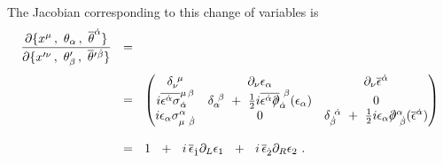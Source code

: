 \documentclass[12pt]{article}
\newcommand{\p}{\partial}
\newcommand{\ov}{\overline}
\def\slashed#1{\setbox0=\hbox{$#1$}             %
   \dimen0=\wd0                                 %
   \setbox1=\hbox{/} \dimen1=\wd1               %
   \ifdim\dimen0>\dimen1                        %
      \rlap{\hbox to \dimen0{\hfil/\hfil}}      %
      #1                                        %
   \else                                        %
      \rlap{\hbox to \dimen1{\hfil$#1$\hfil}}   %
      /                                         %
   \fi}                                        %
\begin{document}
The Jacobian corresponding to this change of variables is
\begin{align*}
	\frac{\p \{ x^\mu\,,~ \theta_\alpha\,,~\ov{\theta}^{\dot{\alpha}} \} }
		{\p \{ x'^\nu \,,~ \theta_\beta'\,,~ \ov{\theta}{}'{}^{\dot{\beta}} \} }  & ~~=~~
\\[1.0mm]
	& ~~=~~
\begin{pmatrix}
	\delta_\nu^{\ \mu}   &   \p_\nu \epsilon_\alpha  &     \p_\nu \ov{\epsilon}^{\dot{\alpha}}  \\
	i \ov{\epsilon^{\dot{\alpha}} \sigma}^{\mu\,\beta}_{\dot{\alpha}}    &
			\delta_\alpha^{\ \beta} ~+~ 
			\frac{1}{2}i \ov{\epsilon^{\dot{\alpha}}\slashed{\p}}_{\dot{\alpha}}^{\ \beta}(\epsilon_\alpha) 
							& 0  \\
	i\epsilon_\alpha \sigma_{\mu\ \dot{\beta}}^{\alpha}  & 0
			& \delta_{\dot{\beta}}^{\ \dot{\alpha}}  ~+~
			\frac{1}{2}i \epsilon_\alpha\slashed{\p}^\alpha_{\ \dot{\beta}}(\ov{\epsilon}^{\dot{\alpha}})
\end{pmatrix} \\[3.0mm]
	&
	~~=~~ 1 ~~+~~ i\, \ov{\epsilon}_{\dot{1}} \p_L \epsilon_1  ~~+~~ i\, \ov{\epsilon}_{\dot{2}} \p_R \epsilon_2~.
\end{align*}
\end{document}
